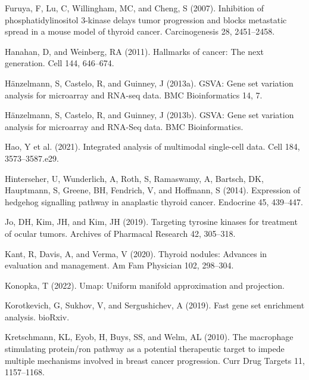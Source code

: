 \documentclass[
  11pt,
  parskip,
  oneside]{scrreprt}
\newlength{\cslhangindent}
\newlength{\cslentryspacingunit} %
\newenvironment{CSLReferences}[2] %
 {%
  \setlength{\parindent}{0pt}
  \ifodd #1
  \let\oldpar\par
  \def\par{\hangindent=\cslhangindent\oldpar}
  \fi
  \setlength{\parskip}{#2\cslentryspacingunit}
 }%
 {}
\begin{document}
\begin{CSLReferences}{0}{0}
\leavevmode{}%
Furuya, F, Lu, C, Willingham, MC, and Cheng, S (2007). Inhibition of
phosphatidylinositol 3-kinase delays tumor progression and blocks
metastatic spread in a mouse model of thyroid cancer. Carcinogenesis 28,
2451--2458.

\leavevmode{}%
Hanahan, D, and Weinberg, RA (2011). Hallmarks of cancer: The next
generation. Cell 144, 646--674.

\leavevmode{}%
Hänzelmann, S, Castelo, R, and Guinney, J (2013a). GSVA: Gene set
variation analysis for microarray and RNA-seq data. BMC Bioinformatics
14, 7.

\leavevmode{}%
Hänzelmann, S, Castelo, R, and Guinney, J (2013b). {GSVA}: Gene set
variation analysis for microarray and {RNA-Seq} data. BMC
Bioinformatics.

\leavevmode{}%
Hao, Y et al. (2021). Integrated analysis of multimodal single-cell
data. Cell 184, 3573--3587.e29.

\leavevmode{}%
Hinterseher, U, Wunderlich, A, Roth, S, Ramaswamy, A, Bartsch, DK,
Hauptmann, S, Greene, BH, Fendrich, V, and Hoffmann, S (2014).
Expression of hedgehog signalling pathway in anaplastic thyroid cancer.
Endocrine 45, 439--447.

\leavevmode{}%
Jo, DH, Kim, JH, and Kim, JH (2019). Targeting tyrosine kinases for
treatment of ocular tumors. Archives of Pharmacal Research 42, 305--318.

\leavevmode{}%
Kant, R, Davis, A, and Verma, V (2020). Thyroid nodules: Advances in
evaluation and management. Am Fam Physician 102, 298--304.

\leavevmode{}%
Konopka, T (2022). Umap: Uniform manifold approximation and projection.

\leavevmode{}%
Korotkevich, G, Sukhov, V, and Sergushichev, A (2019). Fast gene set
enrichment analysis. bioRxiv.

\leavevmode{}%
Kretschmann, KL, Eyob, H, Buys, SS, and Welm, AL (2010). The macrophage
stimulating protein/ron pathway as a potential therapeutic target to
impede multiple mechanisms involved in breast cancer progression. Curr
Drug Targets 11, 1157--1168.


\end{CSLReferences}
\end{document}
